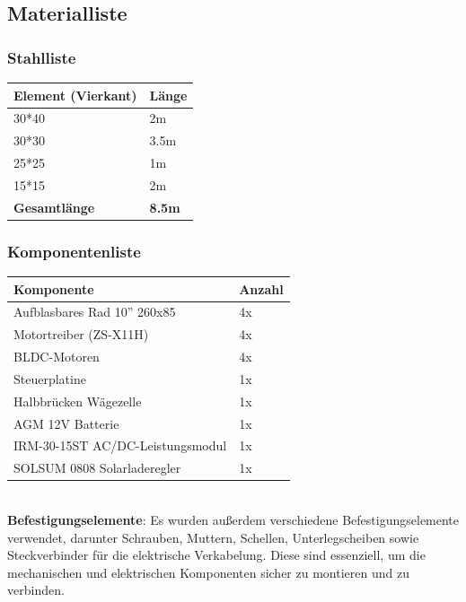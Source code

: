 \documentclass[ngerman,12pt,a4paper]{article}
\begin{document}
		\subsection{Materialliste} %
		
			\subsubsection{Stahlliste}
		
			\begin{tabular}{| l | l |}  
				\hline  
				\textbf{Element (Vierkant)} & \textbf{Länge} \\   
				\hline  
				30*40 & 2m \\  
				\hline  
				30*30 & 3.5m \\  
				\hline  
				25*25 & 1m \\  
				\hline  
				15*15 & 2m \\ 
				\hline  
				\textbf{Gesamtlänge} & \textbf{8.5m} \\ 
				\hline
			\end{tabular}
			
			\subsubsection{Komponentenliste}
		
			\begin{tabular}{| l | l |}  
				\hline  
				\textbf{Komponente} & \textbf{Anzahl} \\   
				\hline  
				Aufblasbares Rad 10'' 260x85 & 4x \\  
				\hline  
				Motortreiber (ZS-X11H) & 4x \\  
				\hline  
				BLDC-Motoren & 4x \\  
				\hline  
				Steuerplatine & 1x \\ 
				\hline  
				Halbbrücken Wägezelle & 1x \\ 
				\hline  
				AGM 12V Batterie & 1x \\ 
				\hline  
				IRM-30-15ST AC/DC-Leistungsmodul & 1x \\ 
				\hline  
				SOLSUM 0808 Solarladeregler & 1x \\ 
				\hline  
			\end{tabular} \\[0.74cm]
			\textbf{Befestigungselemente}: Es wurden außerdem verschiedene Befestigungselemente verwendet, darunter Schrauben, Muttern, Schellen, Unterlegscheiben sowie Steckverbinder für die elektrische Verkabelung. Diese sind essenziell, um die mechanischen und elektrischen Komponenten sicher zu montieren und zu verbinden.
	\newpage
\end{document}
